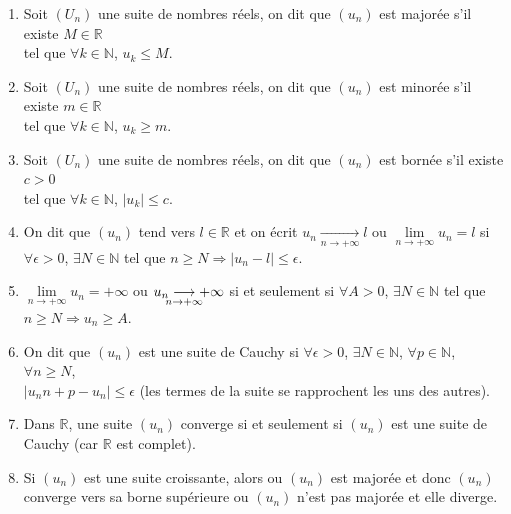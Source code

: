 \documentclass[a4paper,10pt]{book} %
\newcommand{\R}{\mathbb{R}}
\newcommand{\N}{\mathbb{N}}
\newcommand{\abs}[1]{\left|#1\right|}
\newcommand{\lime}[4]{#1\underset{\mathclap{#2 \rightarrow #3}}{\longrightarrow} #4}
\begin{document}
\begin{enumerate}
\item Soit $(U_n)$ une suite de nombres réels, on dit que $(u_n)$ est majorée s'il existe $M\in\R$\\tel que $\forall k\in\N$, $u_k\leq M$.\\

\item Soit $(U_n)$ une suite de nombres réels, on dit que $(u_n)$ est minorée s'il existe $m\in\R$\\tel que $\forall k\in\N$, $u_k\geq m$.\\

\item Soit $(U_n)$ une suite de nombres réels, on dit que $(u_n)$ est bornée s'il existe $c>0$\\ tel que $\forall k\in\N$, $\abs{u_k}\leq c$.\\

\item On dit que $(u_n)$ tend vers $l\in\R$ et on écrit $u_n\underset{n\rightarrow+\infty}{\longrightarrow}l$ ou $\lim\limits_{n\rightarrow +\infty}u_n=l$ si $\forall \epsilon>0$, $\exists N\in\N$ tel que $n\geq N\Rightarrow\abs{u_n-l}\leq \epsilon$.\\

\item $\lim\limits_{n\rightarrow+\infty}u_n=+\infty$ ou $\lime{u_n}{n}{+\infty}{+\infty}$ si et seulement si $\forall A>0$, $\exists N\in\N$ tel que $n\geq N\Rightarrow u_n\geq A$.\\

\item On dit que $(u_n)$ est une suite de Cauchy si $\forall \epsilon>0$, $\exists N\in\N$, $\forall p\in\N$, $\forall n\geq N$, \\$\abs{u_n{n+p}-u_n}\leq \epsilon$ (les termes de la suite se rapprochent les uns des autres).\\

\item Dans $\R$, une suite $(u_n)$ converge si et seulement si $(u_n)$ est une suite de Cauchy (car $\R$ est complet).\\

\item Si $(u_n)$ est une suite croissante, alors ou $(u_n)$ est majorée et donc $(u_n)$ converge vers sa borne supérieure ou $(u_n)$ n'est pas majorée et elle diverge.
\end{enumerate}

\newpage
\end{document}
